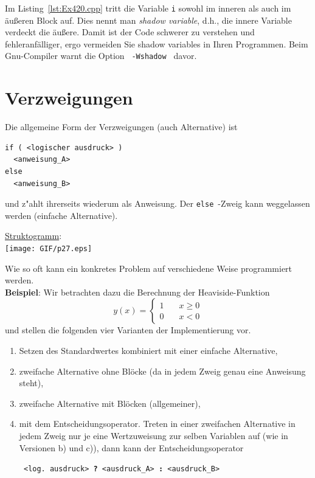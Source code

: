 %
Im Listing~\ref{lst:Ex420.cpp} tritt die Variable \texttt{i} sowohl im inneren
als auch im äußeren Block auf.
Dies nennt man \emph{shadow variable}, d.h., die innere Variable verdeckt die äußere.
Damit ist der Code schwerer zu verstehen und fehleranfälliger, ergo vermeiden Sie
shadow variables in Ihren Programmen.
Beim Gnu-Compiler warnt die Option \verb| -Wshadow | davor.
%
\section{Verzweigungen}
\label{p:4.3}
%
Die allgemeine Form der Verzweigungen (auch Alternative) ist

\mbox{}\hfill
\begin{minipage}[t]{0.6\textwidth}
\begin{verbatim}
if ( <logischer ausdruck> )
  <anweisung_A>
else
  <anweisung_B>
\end{verbatim}
\end{minipage}
\hfill\mbox{}

und z"ahlt ihrerseits wiederum als Anweisung. Der \verb|else|~-Zweig
kann weggelassen werden (einfache Alternative).

\underline{Struktogramm}: \\
\texttt{[image: GIF/p27.eps]}
%

Wie so oft kann ein konkretes Problem auf verschiedene Weise
programmiert werden.
\\
\textbf{Beispiel}: Wir betrachten dazu die Berechnung der
Heaviside-Funktion
$$
 y(x) = \begin{cases} 1 & \quad x \ge 0 \\ 0 & \quad x < 0 \end{cases}
$$
und stellen die folgenden vier Varianten der Implementierung vor.
\begin{enumerate}
	\renewcommand{\labelenumi}{\alph{enumi})}
	\item Setzen des Standardwertes kombiniert mit einer einfache Alternative,
	\item zweifache Alternative ohne Blöcke (da in jedem Zweig genau eine Anweisung steht),
	\item zweifache Alternative mit Blöcken (allgemeiner),
	\item mit dem Entscheidungsoperator.
	  Treten in einer zweifachen Alternative in jedem Zweig nur je eine
      Wertzuweisung zur selben Variablen auf (wie in Versionen b) und c)),
      dann kann der Entscheidungsoperator
      \\
     \centerline {\texttt{ <log.\  ausdruck> {\bf ?} <ausdruck\_A> {\bf :} <ausdruck\_B>  }}
\end{enumerate}
%
%

